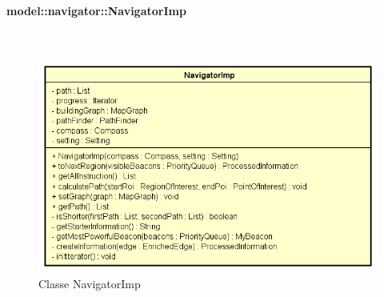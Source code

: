 \documentclass[../DefinizioneDiProdotto.tex]{subfiles}
\begin{document}
\paragraph{model::navigator::NavigatorImp}
\
\begin{figure}[H]
	\centering
	\includegraphics[width=\maxwidth]{img/NavigatorImp.png}
	\caption{Classe NavigatorImp}\label{fig:model::navigator::NavigatorImp} 
\end{figure}
\end{document}
